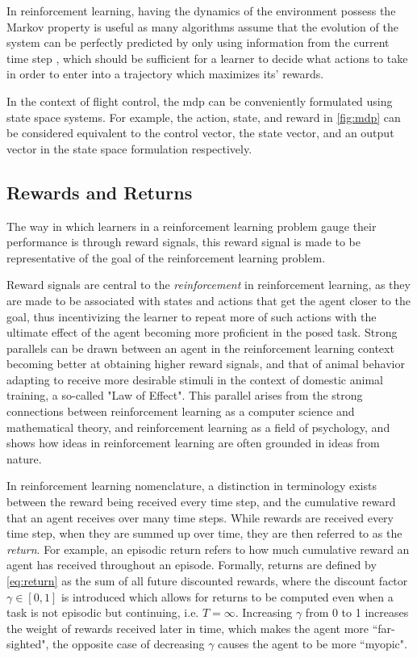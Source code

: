 \documentclass[../report.tex]{subfiles}
\begin{document}
In reinforcement learning, having the dynamics of the environment possess the Markov property is useful as many algorithms assume that the evolution of the system can be perfectly predicted by only using information from the current time step \cite{markov_property}, which should be sufficient for a learner to decide what actions to take in order to enter into a trajectory which maximizes its' rewards.

In the context of flight control, the \ac{mdp} can be conveniently formulated using state space systems. For example, the action, state, and reward in \autoref{fig:mdp} can be considered equivalent to the control vector, the state vector, and an output vector in the state space formulation respectively. 


\subsection{Rewards and Returns}

The way in which learners in a reinforcement learning problem gauge their performance is through reward signals, this reward signal is made to be representative of the goal of the reinforcement learning problem.

Reward signals are central to the \textit{reinforcement} in reinforcement learning, as they are made to be associated with states and actions that get the agent closer to the goal, thus incentivizing the learner to repeat more of such actions with the ultimate effect of the agent becoming more proficient in the posed task. Strong parallels can be drawn between an agent in the reinforcement learning context becoming better at obtaining higher reward signals, and that of animal behavior adapting to receive more desirable stimuli in the context of domestic animal training, a so-called "Law of Effect"\cite{law_of_effect}. This parallel arises from the strong connections between reinforcement learning as a computer science and mathematical theory, and reinforcement learning as a field of psychology, and shows how ideas in reinforcement learning are often grounded in ideas from nature. 

In reinforcement learning nomenclature, a distinction in terminology exists between the reward being received every time step, and the cumulative reward that an agent receives over many time steps. While rewards are received every time step, when they are summed up over time, they are then referred to as the \textit{return}. For example, an episodic return refers to how much cumulative reward an agent has received throughout an episode. Formally, returns are defined by \autoref{eq:return} as the sum of all future discounted rewards, where the discount factor $\gamma \in [0,1]$ is introduced which allows for returns to be computed even when a task is not episodic but continuing, i.e. $T=\infty$. Increasing $\gamma$ from 0 to 1 increases the weight of rewards received later in time, which makes the agent more ``far-sighted", the opposite case of decreasing $\gamma$ causes the agent to be more ``myopic".
\end{document}
